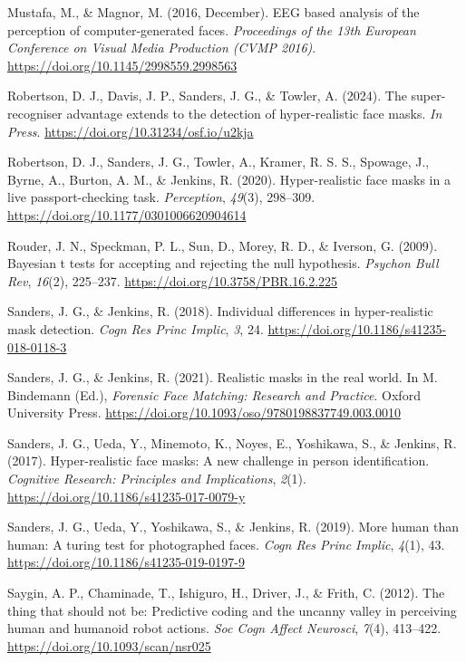 \documentclass[
]{article}
\newlength{\cslhangindent}
\newenvironment{CSLReferences}[2] %
 {\begin{list}{}{%
  \setlength{\itemindent}{0pt}
  \setlength{\leftmargin}{0pt}
  \setlength{\parsep}{0pt}
  \ifodd #1
   \setlength{\leftmargin}{\cslhangindent}
   \setlength{\itemindent}{-1\cslhangindent}
  \fi
  \setlength{\itemsep}{#2\baselineskip}}}
 {\end{list}}
\begin{document}
\begin{CSLReferences}{1}{0}
Mustafa, M., \& Magnor, M. (2016, December). EEG based analysis of the perception of computer-generated faces. \emph{Proceedings of the 13th European Conference on Visual Media Production (CVMP 2016)}. \url{https://doi.org/10.1145/2998559.2998563}

Robertson, D. J., Davis, J. P., Sanders, J. G., \& Towler, A. (2024). The super-recogniser advantage extends to the detection of hyper-realistic face masks. \emph{In Press}. \url{https://doi.org/10.31234/osf.io/u2kja}

Robertson, D. J., Sanders, J. G., Towler, A., Kramer, R. S. S., Spowage, J., Byrne, A., Burton, A. M., \& Jenkins, R. (2020). Hyper-realistic face masks in a live passport-checking task. \emph{Perception}, \emph{49}(3), 298--309. \url{https://doi.org/10.1177/0301006620904614}

Rouder, J. N., Speckman, P. L., Sun, D., Morey, R. D., \& Iverson, G. (2009). Bayesian t tests for accepting and rejecting the null hypothesis. \emph{Psychon Bull Rev}, \emph{16}(2), 225--237. \url{https://doi.org/10.3758/PBR.16.2.225}

Sanders, J. G., \& Jenkins, R. (2018). Individual differences in hyper-realistic mask detection. \emph{Cogn Res Princ Implic}, \emph{3}, 24. \url{https://doi.org/10.1186/s41235-018-0118-3}

Sanders, J. G., \& Jenkins, R. (2021). Realistic masks in the real world. In M. Bindemann (Ed.), \emph{{Forensic Face Matching: Research and Practice}}. Oxford University Press. \url{https://doi.org/10.1093/oso/9780198837749.003.0010}

Sanders, J. G., Ueda, Y., Minemoto, K., Noyes, E., Yoshikawa, S., \& Jenkins, R. (2017). Hyper-realistic face masks: A new challenge in person identification. \emph{Cognitive Research: Principles and Implications}, \emph{2}(1). \url{https://doi.org/10.1186/s41235-017-0079-y}

Sanders, J. G., Ueda, Y., Yoshikawa, S., \& Jenkins, R. (2019). More human than human: A turing test for photographed faces. \emph{Cogn Res Princ Implic}, \emph{4}(1), 43. \url{https://doi.org/10.1186/s41235-019-0197-9}

Saygin, A. P., Chaminade, T., Ishiguro, H., Driver, J., \& Frith, C. (2012). The thing that should not be: Predictive coding and the uncanny valley in perceiving human and humanoid robot actions. \emph{Soc Cogn Affect Neurosci}, \emph{7}(4), 413--422. \url{https://doi.org/10.1093/scan/nsr025}


\end{CSLReferences}
\end{document}

